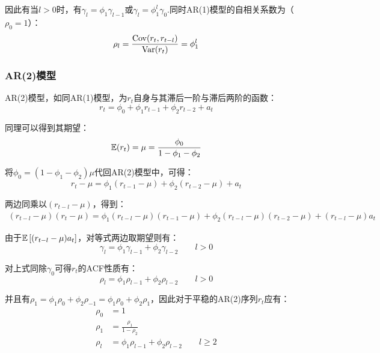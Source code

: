 \documentclass[11pt]{article}
\begin{document}
因此有当$l>0$时，有$\gamma_l=\phi_1 \gamma_{l-1}$或$\gamma_l=\phi_1^l \gamma_{0}$.同时AR(1)模型的自相关系数为（$\rho_0=1$）：
\begin{equation*}
    \rho_l = \frac{\operatorname{Cov}(r_t,r_{t-l})}{\operatorname{Var}(r_t)} = \phi_1^l
\end{equation*}

\subsubsection*{AR(2)模型}

AR(2)模型，如同AR(1)模型，为$r_t$自身与其滞后一阶与滞后两阶的函数：
\begin{equation*}
    r_t = \phi_0 + \phi_1 r_{t-1} + \phi_2 r_{t-2} + a_t
\end{equation*}

同理可以得到其期望：
\begin{equation*}
    \mathbb{E}(r_t) = \mu = \frac{\phi_0}{1-\phi_1-\phi_2}
\end{equation*}

将$\phi_0 = (1-\phi_1-\phi_2)\mu$代回AR(2)模型中，可得：
\begin{equation*}
    r_t - \mu = \phi_1(r_{t-1}-\mu) + \phi_2(r_{t-2}-\mu) + a_t
\end{equation*}

两边同乘以$(r_{t-l}-\mu)$，得到：
\begin{align*}
    (r_{t-l} - \mu)(r_t - \mu) = \phi_1 (r_{t-l}-\mu)(r_{t-1} - \mu)
    + \phi_2 (r_{t-l}-\mu)(r_{t-2} - \mu) + (r_{t-l}-\mu) a_t
\end{align*}

由于$\mathbb{E}\left[(r_{t-l} - \mu)a_t\right]$，对等式两边取期望则有：
\begin{equation*}
    \gamma_l = \phi_1 \gamma_{l-1} + \phi_2 \gamma_{l-2} \qquad l>0
\end{equation*}

对上式同除$\gamma_0$可得$r_t$的ACF性质有：
\begin{equation*}
    \rho_l = \phi_1 \rho_{l-1} + \phi_2 \rho_{l-2} \qquad l>0
\end{equation*}

并且有$\rho_1 = \phi_1 \rho_{0} + \phi_2 \rho_{-1} = \phi_1 \rho_{0} + \phi_2 \rho_{1} $，因此对于平稳的AR(2)序列$r_t$应有：
\begin{align*}
    \rho_0 &= 1 \\
    \rho_1 &= \frac{\rho_1}{1-\rho_2} \\
    \rho_l &= \phi_1 \rho_{l-1} + \phi_2 \rho_{l-2} \qquad l \geq 2
\end{align*}
\end{document}
